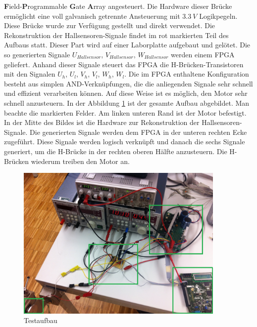     {\textbf{F}ield-\textbf{P}rogrammable \textbf{G}ate 
    \textbf{A}rray} angesteuert. Die Hardware dieser Brücke ermöglicht eine 
    voll galvanisch getrennte Ansteuerung mit $3.3~V$ Logikpegeln. Diese 
    Brücke wurde zur Verfügung gestellt und direkt verwendet. Die 
    Rekonstruktion der Hallsensoren-Signale findet im rot markierten Teil des 
    Aufbaus statt. Dieser Part wird auf einer Laborplatte aufgebaut und 
    gelötet. Die so generierten Signale $U_{Hallsensor}$, $V_{Hallsensor}$, 
    $W_{Hallsensor}$ werden einem FPGA geliefert. Anhand dieser Signale 
    steuert das FPGA die H-Brücken-Transistoren mit den Signalen $U_h$, $U_l$, 
    $V_h$, $V_l$, $W_h$, $W_l$. Die im FPGA enthaltene Konfiguration besteht 
    aus simplen AND-Verknüpfungen, die die anliegenden Signale sehr schnell 
    und effizient verarbeiten können. Auf diese Weise ist es möglich, den 
    Motor sehr schnell anzusteuern.
    In der Abbildung \ref{abb:MessplatzAufbau} ist der gesamte Aufbau 
    abgebildet. Man beachte die markierten Felder. Am linken unteren Rand ist 
    der Motor befestigt. In der Mitte des Bildes ist die Hardware zur 
    Rekonstruktion der Hallsensoren-Signale.  Die generierten Signale werden 
    dem FPGA in der unteren rechten Ecke zugeführt. Diese Signale werden 
    logisch verknüpft und danach die sechs Signale generiert, um die H-Brücke 
    in der rechten oberen Hälfte anzusteuern.  Die H-Brücken wiederum treiben 
    den Motor an.
    \begin{figure}[h!]
       	\includegraphics[width=0.9\textwidth]{fig/MessplatzAufbau.jpg}
       	\centering
       	\caption[Testaufbau BLDC Treiber]{Testaufbau} 
        \label{abb:MessplatzAufbau}
    \end{figure}
